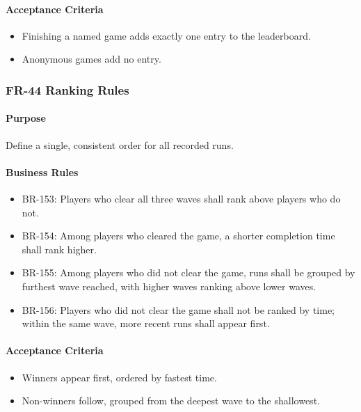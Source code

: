 \documentclass[11pt,a4paper]{article}
\begin{document}
\paragraph{Acceptance Criteria}
\begin{itemize}
  \item Finishing a named game adds exactly one entry to the leaderboard.
  \item Anonymous games add no entry.
\end{itemize}

\subsubsection{FR-44 Ranking Rules}

\paragraph{Purpose}
Define a single, consistent order for all recorded runs.

\paragraph{Business Rules}
\begin{itemize}
  \item BR-153: Players who clear all three waves shall rank above players who do
        not.
  \item BR-154: Among players who cleared the game, a shorter completion time
        shall rank higher.
  \item BR-155: Among players who did not clear the game, runs shall be grouped by
        furthest wave reached, with higher waves ranking above lower waves.
  \item BR-156: Players who did not clear the game shall not be ranked by time;
        within the same wave, more recent runs shall appear first.
\end{itemize}

\paragraph{Acceptance Criteria}
\begin{itemize}
  \item Winners appear first, ordered by fastest time.
  \item Non-winners follow, grouped from the deepest wave to the shallowest.
\end{itemize}
\end{document}
